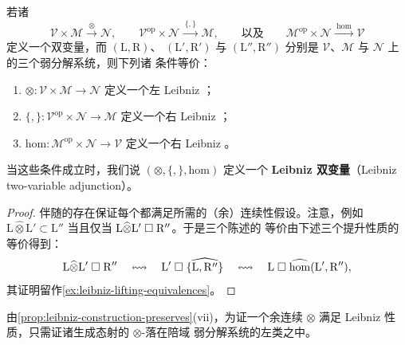 \begin{lemma}\label{lem:leibniz-two-variable-adjunction}
若诸\trBifunctor
\[ \mathcal{V}\times\mathcal{M}\xrightarrow{\;\otimes\;}\mathcal{N},\qquad
   \mathcal{V}^{\mathrm{op}}\times\mathcal{N}\xrightarrow{\;\{,\}\;}
   \mathcal{M},\qquad\text{以及}\qquad
   \mathcal{M}^{\mathrm{op}}\times\mathcal{N}\xrightarrow{\;\mathrm{hom}\;}
   \mathcal{V} \]
定义一个双变量\trAdjunction，而 $(\mathrm{L},\mathrm{R})$、
$(\mathrm{L}',\mathrm{R}')$ 与 $(\mathrm{L}'',\mathrm{R}'')$ 分别是
$\mathcal{V}$、$\mathcal{M}$ 与 $\mathcal{N}$ 上的三个弱分解系统，则下列诸
条件等价：
\begin{enumerate}[label=(\roman*)]
\item $\otimes\colon\mathcal{V}\times\mathcal{M}\to\mathcal{N}$ 定义一个左
  Leibniz \trBifunctor；
\item $\{,\}\colon\mathcal{V}^{\mathrm{op}}\times\mathcal{N}\to\mathcal{M}$
  定义一个右 Leibniz \trBifunctor；
\item $\mathrm{hom}\colon\mathcal{M}^{\mathrm{op}}\times\mathcal{N}\to\mathcal{V}$
  定义一个右 Leibniz \trBifunctor。
\end{enumerate}
当这些条件成立时，我们说 $(\otimes,\{,\},\mathrm{hom})$ 定义一个
\textbf{Leibniz 双变量\trAdjunction}（Leibniz two-variable adjunction）。
\end{lemma}
\begin{proof}
伴随的存在保证每个\trBifunctor{}都满足所需的（余）连续性假设。注意，例如
$\mathrm{L}\widehat{\otimes}\mathrm{L}'\subset\mathrm{L}''$ 当且仅当
$\mathrm{L}\widehat{\otimes}\mathrm{L}'\mathrel{\square}\mathrm{R}''$。于是三个陈述的%
等价由下述三个提升性质的等价得到：
\[ \mathrm{L}\widehat{\otimes}\mathrm{L}'\mathrel{\square}\mathrm{R}''
   \quad\leftrightsquigarrow\quad
   \mathrm{L}'\mathrel{\square}\widehat{\{\mathrm{L},\mathrm{R}''\}}
   \quad\leftrightsquigarrow\quad
   \mathrm{L}\mathrel{\square}\widehat{\mathrm{hom}}(\mathrm{L}',\mathrm{R}''), \]
其证明留作\cref{ex:leibniz-lifting-equivalences}。
\end{proof}

\begin{remark}\label{rem:leibniz-generators}
由\cref{prop:leibniz-construction-preserves}(vii)，为证一个余连续\trBifunctor{}
$\otimes$ 满足 Leibniz 性质，只需证诸生成态射的 $\otimes$-\trLeibnizProduct{}落在陪域
弱分解系统的左类之中。
\end{remark}


